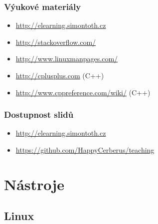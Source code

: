 \begin{frame}
	\frametitle{Výukové materiály}
	\begin{itemize}
		\item{\url{http://elearning.simontoth.cz}}
		\item{\url{http://stackoverflow.com/}}
		\item{\url{http://www.linuxmanpages.com/}}
		\item{\url{http://cplusplus.com} (C++)}
		\item{\url{http://www.cppreference.com/wiki/} (C++)}
	\end{itemize}
\end{frame}

\begin{frame}
\frametitle{Dostupnost slidů}
	\begin{itemize}
		\item{\url{http://elearning.simontoth.cz}}
		\item{\url{https://github.com/HappyCerberus/teaching}}
	\end{itemize}
\end{frame}

\section{Nástroje}
\subsection{Linux}

